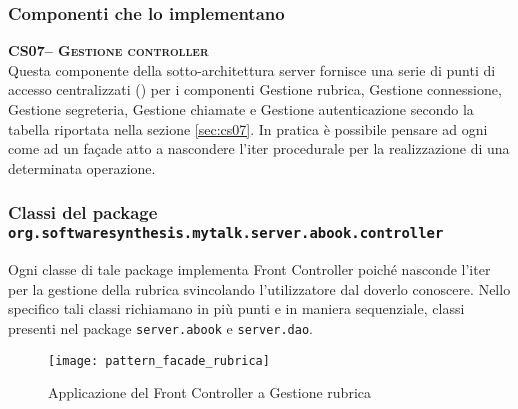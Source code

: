 \subsubsection{Componenti che lo implementano}
\begin{description}
  \item{\scshape\bfseries CS07-- Gestione controller}\\
Questa componente della sotto-architettura server fornisce una serie di punti di accesso centralizzati () per i componenti \textsf{Gestione rubrica}, \textsf{Gestione connessione}, \textsf{Gestione segreteria}, \textsf{Gestione chiamate} e \textsf{Gestione autenticazione} secondo la tabella riportata nella sezione \vref{sec:cs07}. In pratica è possibile pensare ad ogni  come ad un façade atto a nascondere l'iter procedurale per la realizzazione di una determinata operazione.
\end{description}

\subsubsection*{Classi del package \texttt{org.softwaresynthesis.mytalk.server.abook.controller}}

Ogni classe di tale package implementa Front Controller poiché nasconde l'iter per la gestione della rubrica svincolando l'utilizzatore dal doverlo conoscere. Nello specifico tali classi richiamano in più punti e in maniera sequenziale, classi presenti nel package \texttt{server.abook} e \texttt{server.dao}.

\begin{figure}[H]
  \centering
   \texttt{[image: pattern\_facade\_rubrica]}
  \caption{Applicazione del  Front Controller a \textsf{Gestione rubrica}}\label{fig:facadeaddressbook1}
\end{figure}


